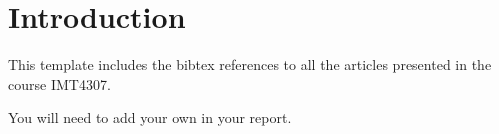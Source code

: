\section{Introduction}
This template includes the bibtex references to all the articles presented in the course IMT4307.

You will need to add your own in your report.